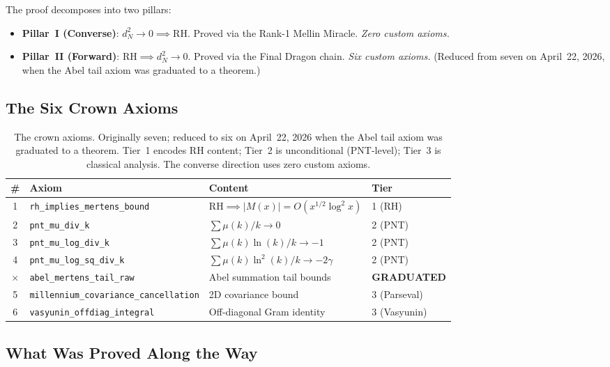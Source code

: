\documentclass[11pt,a4paper]{article}
\theoremstyle{definition}
\newcommand{\RH}{\mathrm{RH}}
\newcommand{\lean}[1]{\texttt{#1}}
\begin{document}
The proof decomposes into two pillars:
\begin{itemize}
  \item \textbf{Pillar~I (Converse)}: $d_N^2 \to 0 \implies \RH$.
    Proved via the Rank-1 Mellin Miracle. \emph{Zero custom axioms.}
  \item \textbf{Pillar~II (Forward)}: $\RH \implies d_N^2 \to 0$.
    Proved via the Final Dragon chain. \emph{Six custom axioms.}
    (Reduced from seven on April~22, 2026, when the Abel tail axiom
    was graduated to a theorem.)
\end{itemize}

\subsection{The Six Crown Axioms}

\begin{table}[h]
\centering
\small
\begin{tabular}{@{}clll@{}}
\toprule
\textbf{\#} & \textbf{Axiom} & \textbf{Content} & \textbf{Tier} \\
\midrule
1 & \lean{rh\_implies\_mertens\_bound} & $\RH \implies |M(x)| = O(x^{1/2}\log^2 x)$ & 1 (RH) \\
2 & \lean{pnt\_mu\_div\_k} & $\sum \mu(k)/k \to 0$ & 2 (PNT) \\
3 & \lean{pnt\_mu\_log\_div\_k} & $\sum \mu(k)\ln(k)/k \to -1$ & 2 (PNT) \\
4 & \lean{pnt\_mu\_log\_sq\_div\_k} & $\sum \mu(k)\ln^2(k)/k \to -2\gamma$ & 2 (PNT) \\
\rowcolor{green!10}
$\times$ & \lean{abel\_mertens\_tail\_raw} & Abel summation tail bounds & \textbf{GRADUATED} \\
5 & \lean{millennium\_covariance\_cancellation} & 2D covariance bound & 3 (Parseval) \\
6 & \lean{vasyunin\_offdiag\_integral} & Off-diagonal Gram identity & 3 (Vasyunin) \\
\bottomrule
\end{tabular}
\caption{The crown axioms. Originally seven; reduced to six on April~22, 2026
when the Abel tail axiom was graduated to a theorem. Tier~1 encodes RH
content; Tier~2 is unconditional (PNT-level); Tier~3 is classical analysis.
The converse direction uses zero custom axioms.}
\label{tab:axioms}
\end{table}

\subsection{What Was Proved Along the Way}
\end{document}
